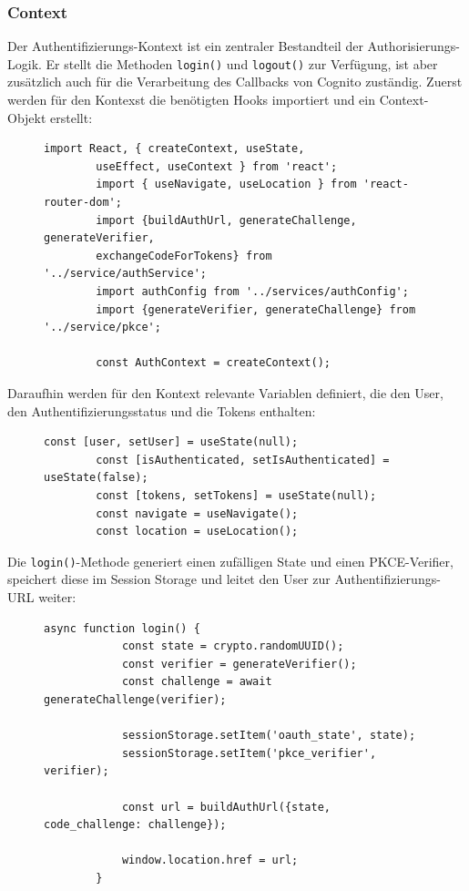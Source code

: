 \subsubsection{Context}
Der Authentifizierungs-Kontext ist ein zentraler Bestandteil der Authorisierungs-Logik. Er stellt die Methoden \texttt{login()} und \texttt{logout()} 
zur Verfügung, ist aber zusätzlich auch für die Verarbeitung des Callbacks von Cognito zuständig.
Zuerst werden für den Kontexst die benötigten Hooks importiert und ein Context-Objekt erstellt:
\begin{figure}[H]
    \begin{lstlisting}[caption=Import und Kontext, label=list:authcontextimports]
        import React, { createContext, useState, 
        useEffect, useContext } from 'react';
        import { useNavigate, useLocation } from 'react-router-dom';
        import {buildAuthUrl, generateChallenge, generateVerifier, 
        exchangeCodeForTokens} from '../service/authService';
        import authConfig from '../services/authConfig';
        import {generateVerifier, generateChallenge} from '../service/pkce';

        const AuthContext = createContext();
    \end{lstlisting}
\end{figure}
Daraufhin werden für den Kontext relevante Variablen definiert, die den User, den Authentifizierungsstatus und die Tokens enthalten:
\begin{figure}[H]
    \begin{lstlisting}[caption=Variablen für den Authentifizierungs-Kontext, label=list:authcontextvariables]
        const [user, setUser] = useState(null);
        const [isAuthenticated, setIsAuthenticated] = useState(false);
        const [tokens, setTokens] = useState(null);
        const navigate = useNavigate();
        const location = useLocation();
    \end{lstlisting}
\end{figure}
Die \texttt{login()}-Methode generiert einen zufälligen State und einen PKCE-Verifier, speichert diese im Session Storage und 
leitet den User zur Authentifizierungs-URL weiter:
\begin{figure}[H]
    \begin{lstlisting}[caption=Login-Methode, label=list:authcontextlogin]
        async function login() {
            const state = crypto.randomUUID();
            const verifier = generateVerifier();
            const challenge = await generateChallenge(verifier);

            sessionStorage.setItem('oauth_state', state);
            sessionStorage.setItem('pkce_verifier', verifier);
            
            const url = buildAuthUrl({state, code_challenge: challenge});

            window.location.href = url;
        }
\end{lstlisting}
\end{figure}
